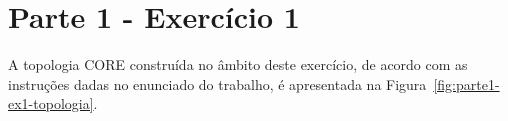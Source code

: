 
\section*{Parte 1 - Exercício 1}


A topologia CORE construída no âmbito deste exercício, de acordo com as
instruções dadas no enunciado do trabalho, é apresentada na
Figura~\ref{fig:parte1-ex1-topologia}.


